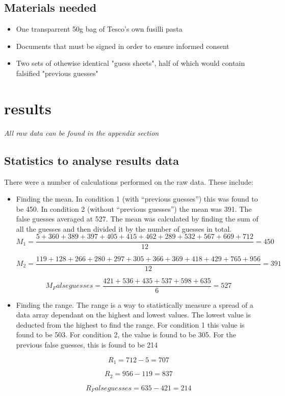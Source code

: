 \documentclass{report}
\begin{document}
\subsection{Materials needed}
\begin{itemize}
  \item One transparrent 50g bag of Tesco's own fusilli pasta
  \item Documents that must be signed in order to ensure informed consent
  \item Two sets of othewise identical "guess sheets", half of which would contain falsified "previous guesses"
\end{itemize}
\section{results}
\textit{All raw data can be found in the appendix section}
\subsection{Statistics to analyse results data}
There were a number of calculations performed on the raw data. These include:
\begin{itemize}
\item Finding the mean. In condition 1 (with “previous guesses”) this was found to be 450. In condition 2 (without “previous guesses”) the mean was 391. The false guesses averaged at 527. The mean was calculated by finding the sum of all the guesses and then divided it by the number of guesses in total.
\begin{displaymath}
M_1 = \frac{5+360+389+397+405+415+462+289+532+567+669+712}{12} = 450
\end{displaymath}

\begin{displaymath}
M_2 = \frac{119+128+266+280+297+305+366+369+418+429+765+956}{12} = 391
\end{displaymath}

\begin{displaymath}
M_Falseguesses = \frac{421+536+435+537+598+635}{6} = 527
\end{displaymath}

\item Finding the range. The range is a way to statistically measure a spread of a data array dependant on the highest and lowest values. The lowest value is deducted from the highest to find the range. For condition 1 this value is found to be 503. For condition 2, the value is found to be 305. For the previous false guesses, this is found to be 214

\begin{displaymath}
R_1 = 712-5 = 707
\end{displaymath}

\begin{displaymath}
R_2 = 956 - 119 = 837
\end{displaymath}

\begin{displaymath}
R_Falseguesses = 635-421 = 214
\end{displaymath}
\end{itemize}
\end{document}
